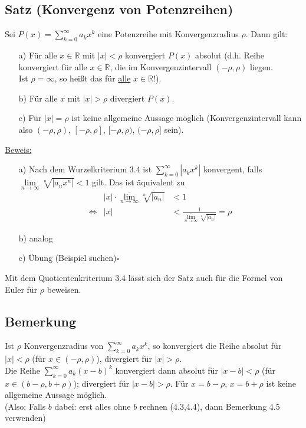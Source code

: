 \documentclass[12pt, titlepage]{article}
\newcommand{\R}{\mathds{R}}
\newcommand{\infn}{n\rightarrow\infty}
\renewcommand{\>}{\rightarrow}
\renewcommand{\*}{\cdot}
\renewcommand{\limsup}[1]{\underset{#1}{\overline{\lim}}}
\begin{document}
	\subsection{Satz (Konvergenz von Potenzreihen)}
	Sei $P(x)=\sum_{k=0}^{\infty}a_kx^k$ eine Potenzreihe mit Konvergenzradius $\rho$. Dann gilt:
	\begin{itemize}
		\item[a)] Für alle $x\in\R$ mit $|x|<\rho$ konvergiert $P(x)$ absolut (d.h. Reihe konvergiert für alle $x\in\R$, die im Konvergenzintervall $(-\rho,\rho)$ liegen.\\
		Ist $\rho=\infty$, so heißt das für \underline{alle} $x\in\R$!).
		\item[b)] Für alle $x$ mit $|x|>\rho$ divergiert $P(x)$.
		\item[c)] Für $|x|=\rho$ ist keine allgemeine Aussage möglich (Konvergenzintervall kann also $(-\rho,\rho)$, $[-\rho,\rho]$, $[-\rho,\rho)$, $(-\rho,\rho]$ sein).
	\end{itemize}
	\underline{Beweis:}
	\begin{itemize}
		\item[a)] Nach dem Wurzelkriterium 3.4  ist $\sum_{k=0}^{\infty}|a_kx^k|$ konvergent, falls $\limsup{\infn}\sqrt[n]{|a_nx^n|}<1$ gilt. Das ist äquivalent zu
		\begin{align*}
			&|x|\*\limsup{\infn}\sqrt[n]{|a_n|}&<1\\
			\Leftrightarrow&|x|&<\frac{1}{\limsup{\infn}\sqrt[n]{|a_n|}}=\rho
		\end{align*}
		\item[b)] analog
		\item[c)] Übung (Beispiel suchen)\hfill$\square$
	\end{itemize}
	Mit dem Quotientenkriterium 3.4  lässt sich der Satz auch für die Formel von Euler für $\rho$ beweisen.	
	\subsection{Bemerkung}
	Ist $\rho$ Konvergenzradius von $\sum_{k=0}^{\infty}a_kx^k$, so konvergiert die Reihe absolut für $|x|<\rho$ (für $x\in(-\rho,\rho)$), divergiert für $|x|>\rho$.\\
	Die Reihe $\sum_{k=0}^{\infty}a_k(x-b)^k$ konvergiert dann absolut für $|x-b|<\rho$ (für $x\in(b-\rho,b+\rho)$); divergiert für $|x-b|>\rho$. Für $x=b-\rho$, $x=b+\rho$ ist keine allgemeine Aussage möglich.\\
	(Also: Falls $b$ dabei: erst alles ohne $b$ rechnen (4.3,4.4), dann Bemerkung 4.5 verwenden)
\end{document}
